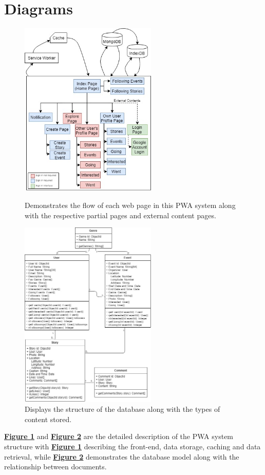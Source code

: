 \documentclass[11pt, a4paper]{article}
\begin{document}
\section{Diagrams}
\begin{figure}[H]
  \begin{center}
    \begin{minipage}[b]{0.4\textwidth}
      \includegraphics[width=6.5cm]{site_map.jpg}
      \caption{Demonstrates the flow of each web page in this PWA system along with the respective
      partial pages and external content pages.}
      \label{figure:site_map}
    \end{minipage}
    \qquad
    \begin{minipage}[b]{0.4\textwidth}
      \includegraphics[width=6.5cm]{uml.jpg}
      \caption{Displays the structure of the database along with the types of content stored.}
      \label{figure:uml}
    \end{minipage}
  \end{center}
\end{figure}
\hyperref[figure:site_map]{\textbf{Figure 1}} and \hyperref[figure:uml]{\textbf{Figure 2}} are the
detailed description of the PWA system structure with \hyperref[figure:site_map]{\textbf{Figure 1}}
describing the front-end, data storage, caching and data retrieval, while
\hyperref[figure:uml]{\textbf{Figure 2}} demonstrates the database model along with the relationship
between documents.
\end{document}
